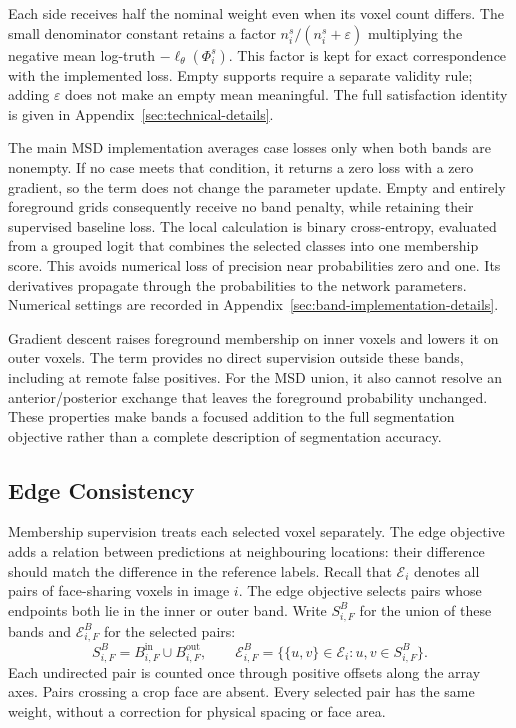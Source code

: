 \documentclass[12pt,a4paper]{article}
\begin{document}
Each side receives half the nominal weight even when its voxel count
differs. The small denominator constant retains a factor
$n_i^s/(n_i^s+\varepsilon)$ multiplying the negative mean log-truth
$-\ell_\theta(\Phi_i^s)$. This factor is kept for exact correspondence
with the implemented loss. Empty supports require a separate validity
rule; adding $\varepsilon$ does not make an empty mean meaningful.
The full satisfaction identity is given in
Appendix~\ref{sec:technical-details}.

The main MSD implementation averages case losses only when both bands are
nonempty. If no case meets that condition, it returns a zero loss with a
zero gradient, so the term does not change the parameter update. Empty and
entirely foreground grids consequently receive no band penalty, while
retaining their supervised baseline loss. The local calculation is binary
cross-entropy, evaluated from a grouped logit that combines the selected
classes into one membership score. This avoids numerical loss of precision
near probabilities zero and one. Its derivatives propagate through the
probabilities to the network parameters. Numerical settings are recorded in
Appendix~\ref{sec:band-implementation-details}.

Gradient descent raises foreground membership on inner voxels and lowers
it on outer voxels. The term provides no direct supervision outside
these bands, including at remote false positives. For the MSD union,
it also cannot resolve an anterior/posterior exchange that leaves the
foreground probability unchanged. These properties make bands a focused
addition to the full segmentation objective rather than a complete
description of segmentation accuracy.

\subsection{Edge Consistency}\label{sec:edge-constraints}

Membership supervision treats each selected voxel separately. The edge
objective adds a relation between predictions at neighbouring locations:
their difference should match the difference in the reference labels.
Recall that $\mathcal E_i$ denotes all pairs of face-sharing voxels in
image $i$. The edge objective selects pairs whose endpoints both lie
in the inner or outer band. Write $S_{i,F}^{B}$ for the union of these
bands and $\mathcal E_{i,F}^{B}$ for the selected pairs:
\begin{equation}
S_{i,F}^{B}=B_{i,F}^{\mathrm{in}}\cup B_{i,F}^{\mathrm{out}},
\qquad
\mathcal{E}_{i,F}^{B}
=\bigl\{\{u,v\}\in\mathcal{E}_i:
          u,v\in S_{i,F}^{B}\bigr\}.
\label{eq:edge-supported-pairs}
\end{equation}
Each undirected pair is counted once through positive offsets along
the array axes. Pairs crossing a crop face are absent. Every selected
pair has the same weight, without a correction for physical spacing or
face area.
\end{document}
